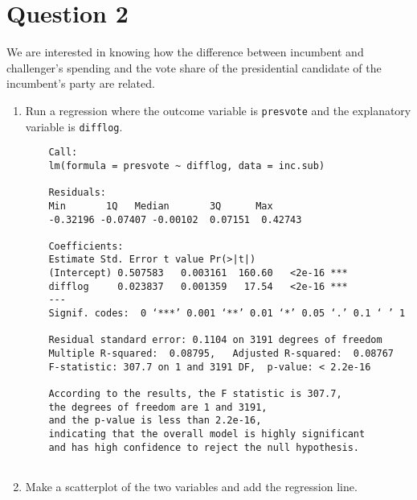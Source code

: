 \documentclass[12pt,letterpaper]{article}
\begin{document}
\vspace{.5cm}

\section*{Question 2}
\noindent We are interested in knowing how the difference between incumbent and challenger's spending and the vote share of the presidential candidate of the incumbent's party are related.	\vspace{.25cm}
	\begin{enumerate}
		\item Run a regression where the outcome variable is \texttt{presvote} and the explanatory variable is \texttt{difflog}.	
		
		\vspace{.15cm}
		 
		\vspace{.15cm}
	\begin{footnotesize}
		\begin{verbatim} 
	Call:
	lm(formula = presvote ~ difflog, data = inc.sub)
	
	Residuals:
	Min       1Q   Median       3Q      Max 
	-0.32196 -0.07407 -0.00102  0.07151  0.42743 
	
	Coefficients:
	Estimate Std. Error t value Pr(>|t|)    
	(Intercept) 0.507583   0.003161  160.60   <2e-16 ***
	difflog     0.023837   0.001359   17.54   <2e-16 ***
	---
	Signif. codes:  0 ‘***’ 0.001 ‘**’ 0.01 ‘*’ 0.05 ‘.’ 0.1 ‘ ’ 1
	
	Residual standard error: 0.1104 on 3191 degrees of freedom
	Multiple R-squared:  0.08795,	Adjusted R-squared:  0.08767 
	F-statistic: 307.7 on 1 and 3191 DF,  p-value: < 2.2e-16
	
	According to the results, the F statistic is 307.7, 
	the degrees of freedom are 1 and 3191, 
	and the p-value is less than 2.2e-16, 
	indicating that the overall model is highly significant 
	and has high confidence to reject the null hypothesis.
	
			\end{verbatim}
	\end{footnotesize}
		\vspace{.15cm}
		\item Make a scatterplot of the two variables and add the regression line. 	
		\vspace{.15cm}
		 
		\vspace{.15cm}
		\begin{figure}[h!]\centering
			

\end{figure}
\end{enumerate}
\end{document}

